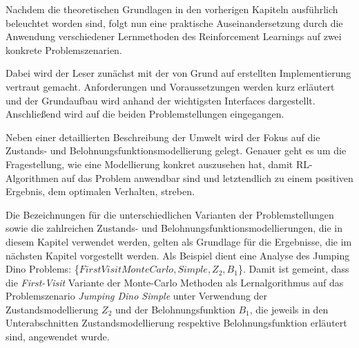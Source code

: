 Nachdem die theoretischen Grundlagen in den vorherigen Kapiteln ausführlich beleuchtet worden sind, folgt nun eine praktische Auseinandersetzung durch die Anwendung verschiedener Lernmethoden des Reinforcement Learnings auf zwei konkrete Problemszenarien. 
\par 
Dabei wird der Leser zunächst mit der von Grund auf erstellten Implementierung vertraut gemacht. Anforderungen und Voraussetzungen werden kurz erläutert und der Grundaufbau wird anhand der wichtigsten Interfaces dargestellt. Anschließend wird auf die beiden Problemstellungen eingegangen. 
\par 
Neben einer detaillierten Beschreibung der Umwelt wird der Fokus auf die Zustands- und Belohnungsfunktionsmodellierung gelegt. Genauer geht es um die Fragestellung, wie eine Modellierung konkret auszusehen hat, damit RL-Algorithmen auf das Problem anwendbar sind und letztendlich zu einem positiven Ergebnis, dem optimalen Verhalten, streben.
\par
Die Bezeichnungen für die unterschiedlichen Varianten der Problemstellungen sowie die zahlreichen Zustands- und Belohnungsfunktionsmodellierungen, die in diesem Kapitel verwendet werden, gelten als Grundlage für die Ergebnisse, die im nächsten Kapitel vorgestellt werden. Als Beispiel dient eine Analyse des Jumping Dino Problems: \{$FirstVisitMonteCarlo,Simple, Z_2, B_1$\}. Damit ist gemeint, dass die \textit{First-Visit }Variante der Monte-Carlo Methoden als Lernalgorithmus auf das Problemszenario \textit{Jumping Dino Simple} unter Verwendung der Zustandsmodellierung $Z_2$ und der Belohnungsfunktion $B_1$, die jeweils in den Unterabschnitten \glqq Zustandsmodellierung\grqq{} respektive \glqq Belohnungsfunktion\grqq{} erläutert sind, angewendet wurde.
